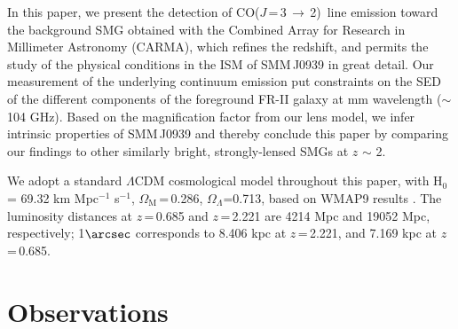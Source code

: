 \documentclass[twocolumn,apj,numberedappendix]{emulateapj}
\newcommand{\CO}{\mbox{CO($J$\,=\,3\,$\rightarrow$\,2) }}
\newcommand{\pmOne}{\mbox{$^{-1}$}}
\begin{document}
In this paper, we present the detection of \CO line emission toward the background SMG obtained with the Combined
Array for Research in Millimeter Astronomy (CARMA), which refines the redshift, and permits the study of the physical conditions in the ISM of SMM\,J0939 in great detail. Our measurement of the underlying continuum emission put constraints on the SED of the different components of the foreground FR-II galaxy at mm wavelength ($\sim$104 GHz). Based on the magnification factor from our lens model, we infer intrinsic properties of SMM\,J0939 and thereby 
conclude this paper by comparing our findings to other similarly bright, strongly-lensed SMGs at $z$\,\,$\sim$\,\,2.

We adopt a standard $\Lambda$CDM cosmological model throughout this paper, with H$_0$= 69.32 km\,\,Mpc\pmOne\,\,s\pmOne, $\Omega_\textrm{M}$\,=\,0.286, $\Omega_\Lambda$=0.713, based on WMAP9 results \citep{Hinshaw13a}.
The luminosity distances at $z$\,=\,0.685 and $z$\,=\,2.221 are 4214 Mpc and 19052 Mpc, respectively; 1$\arcsec$
corresponds to 8.406 kpc at $z$\,=\,2.221, and 7.169 kpc at $z$\,=\,0.685.

\section{Observations}\label{sec:obs}
\end{document}
